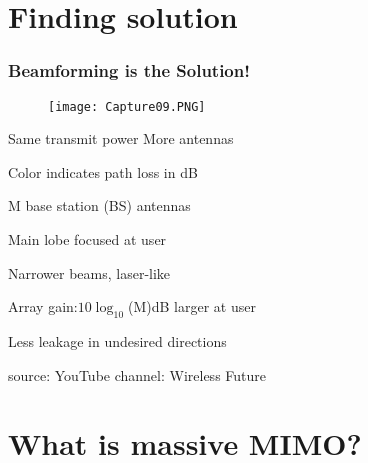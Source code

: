 \documentclass{beamer}
\begin{document}
\section{Finding solution}

\begin{frame}[t,fragile=singleslide]\frametitle{Beamforming is the Solution!}
\begin{figure}
  \texttt{[image: Capture09.PNG]}
\end{figure}
Same transmit power \hspace{1.85cm}        More antennas


\vspace{0.35cm}
\begin{itemize}
	\begin{minipage}{0.49\linewidth}
        \item \footnotesize Color indicates path loss in dB
        \item \footnotesize M base station (BS) antennas
        \item \footnotesize Main lobe focused at user
    \end{minipage}
    \begin{minipage}{0.49\linewidth}
        \item \footnotesize Narrower beams, laser-like
        \item \scriptsize Array gain:$ 10\log_{10}$(M)dB larger at user
        \item \footnotesize Less leakage in undesired directions
   \end{minipage}
\end{itemize}

\vspace{0.65cm}
\centerline{\tiny source: YouTube channel: Wireless Future}
\end{frame}

\section{What is massive MIMO?}
\end{document}

